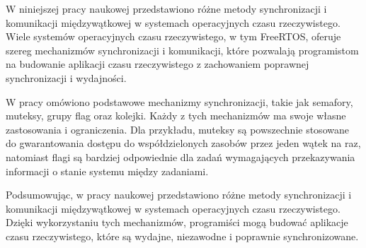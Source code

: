 W niniejszej pracy naukowej przedstawiono różne metody synchronizacji i komunikacji międzywątkowej w systemach operacyjnych czasu rzeczywistego.
Wiele systemów operacyjnych czasu rzeczywistego, w tym FreeRTOS, oferuje szereg mechanizmów synchronizacji i komunikacji, które pozwalają
programistom na budowanie aplikacji czasu rzeczywistego z zachowaniem poprawnej synchronizacji i wydajności.

W pracy omówiono podstawowe mechanizmy synchronizacji, takie jak semafory, muteksy, grupy flag oraz kolejki. Każdy z tych mechanizmów ma swoje własne
zastosowania i ograniczenia. Dla przykładu, muteksy są powszechnie stosowane do gwarantowania dostępu do współdzielonych zasobów przez jeden wątek na raz,
natomiast flagi są bardziej odpowiednie dla zadań wymagających przekazywania informacji o stanie systemu między zadaniami.

Podsumowując, w pracy naukowej przedstawiono różne metody synchronizacji i komunikacji międzywątkowej w systemach operacyjnych czasu rzeczywistego.
Dzięki wykorzystaniu tych mechanizmów, programiści mogą budować aplikacje czasu rzeczywistego, które są wydajne, niezawodne i poprawnie synchronizowane.